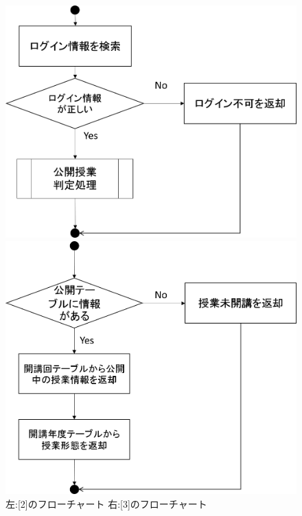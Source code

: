 \begin{figure}[htbp]
 \begin{minipage}{0.5\hsize}
  \begin{center}
   \includegraphics[width=1\linewidth,clip]{./img/login/sub2.png}
  \end{center}
 \end{minipage}
 \begin{minipage}{0.5\hsize}
  \begin{center}
   \includegraphics[width=0.5\linewidth,clip]{./img/login/sub3.png}
  \end{center}
 \end{minipage}
 \caption{左:[2]のフローチャート 右:[3]のフローチャート}\label{fig:loginflow1}
\end{figure}

